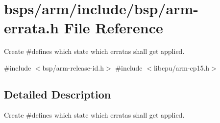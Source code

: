 \hypertarget{arm-errata_8h}{}\section{bsps/arm/include/bsp/arm-\/errata.h File Reference}
\label{arm-errata_8h}


Create \#defines which state which erratas shall get applied.  


{\ttfamily \#include $<$bsp/arm-\/release-\/id.\+h$>$}\newline
{\ttfamily \#include $<$libcpu/arm-\/cp15.\+h$>$}\newline


\subsection{Detailed Description}
Create \#defines which state which erratas shall get applied. 

